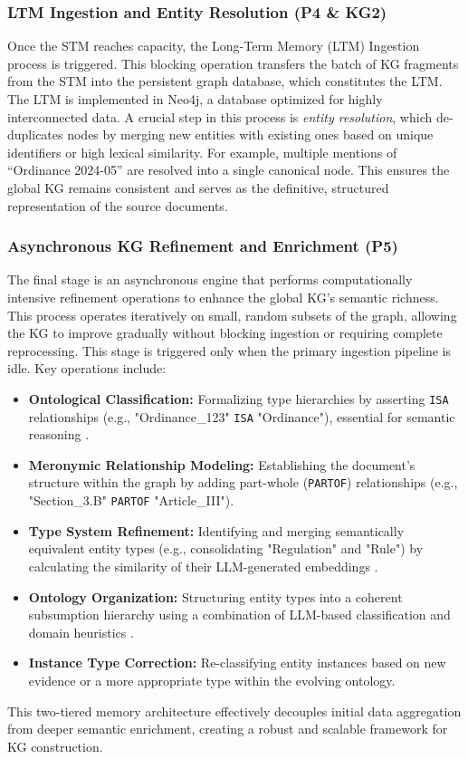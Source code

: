 \subsubsection{LTM Ingestion and Entity Resolution (P4 \& KG2)}
Once the STM reaches capacity, the Long-Term Memory (LTM) Ingestion process is triggered. This blocking operation transfers the batch of KG fragments from the STM into the persistent graph database, which constitutes the LTM. The LTM is implemented in Neo4j, a database optimized for highly interconnected data. A crucial step in this process is \textit{entity resolution}, which de-duplicates nodes by merging new entities with existing ones based on unique identifiers or high lexical similarity. For example, multiple mentions of ``Ordinance 2024-05'' are resolved into a single canonical node. This ensures the global KG remains consistent and serves as the definitive, structured representation of the source documents.

\subsubsection{Asynchronous KG Refinement and Enrichment (P5)}
The final stage is an asynchronous engine that performs computationally intensive refinement operations to enhance the global KG's semantic richness. This process operates iteratively on small, random subsets of the graph, allowing the KG to improve gradually without blocking ingestion or requiring complete reprocessing. This stage is triggered only when the primary ingestion pipeline is idle. Key operations include:
\begin{itemize}
    \item \textbf{Ontological Classification:} Formalizing type hierarchies by asserting \texttt{ISA} relationships (e.g., "Ordinance\_123" \texttt{ISA} "Ordinance"), essential for semantic reasoning \parencite{RefWorks:RefID:135-noy2001ontology, RefWorks:RefID:78-minsky1974framework}.
    \item \textbf{Meronymic Relationship Modeling:} Establishing the document's structure within the graph by adding part-whole (\texttt{PARTOF}) relationships (e.g., "Section\_3.B" \texttt{PARTOF} "Article\_III").
    \item \textbf{Type System Refinement:} Identifying and merging semantically equivalent entity types (e.g., consolidating "Regulation" and "Rule") by calculating the similarity of their LLM-generated embeddings \parencite{RefWorks:RefID:167-gardazi2025bert}.
    \item \textbf{Ontology Organization:} Structuring entity types into a coherent subsumption hierarchy using a combination of LLM-based classification and domain heuristics \parencite{RefWorks:RefID:6-2022knowledge}.
    \item \textbf{Instance Type Correction:} Re-classifying entity instances based on new evidence or a more appropriate type within the evolving ontology.
\end{itemize}
This two-tiered memory architecture effectively decouples initial data aggregation from deeper semantic enrichment, creating a robust and scalable framework for KG construction.

